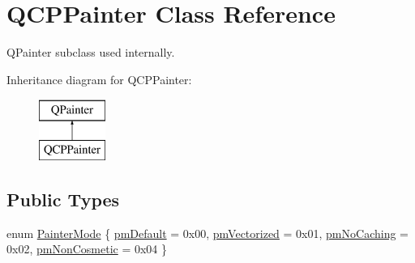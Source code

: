 \hypertarget{class_q_c_p_painter}{}\section{Q\+C\+P\+Painter Class Reference}
\label{class_q_c_p_painter}


Q\+Painter subclass used internally.  


Inheritance diagram for Q\+C\+P\+Painter\+:\begin{figure}[H]
\begin{center}
\leavevmode
\includegraphics[height=2.000000cm]{class_q_c_p_painter}
\end{center}
\end{figure}
\subsection*{Public Types}
\begin{DoxyCompactItemize}
\item 
enum \hyperlink{class_q_c_p_painter_a156cf16444ff5e0d81a73c615fdb156d}{Painter\+Mode} \{ \hyperlink{class_q_c_p_painter_a156cf16444ff5e0d81a73c615fdb156da3bac5e87e3d58553b297befb4eee2a45}{pm\+Default} = 0x00, 
\hyperlink{class_q_c_p_painter_a156cf16444ff5e0d81a73c615fdb156daeda679cd55dcd468341d07d48a30b6ab}{pm\+Vectorized} = 0x01, 
\hyperlink{class_q_c_p_painter_a156cf16444ff5e0d81a73c615fdb156dae78f9a4eb277a5f9207f50850a51a0b0}{pm\+No\+Caching} = 0x02, 
\hyperlink{class_q_c_p_painter_a156cf16444ff5e0d81a73c615fdb156dac1e481bfaf408f2bd2eaad3ec341f36b}{pm\+Non\+Cosmetic} = 0x04
 \}
\end{DoxyCompactItemize}
